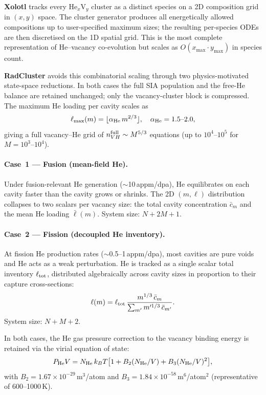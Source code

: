 \documentclass[12pt,letterpaper]{article}
\begin{document}
\textbf{Xolotl} tracks every He$_x$V$_y$ cluster as a distinct species
on a 2D composition grid in $(x,y)$ space.  The cluster generator
produces all energetically allowed compositions up to user-specified
maximum sizes; the resulting per-species ODEs are then discretised on the
1D spatial grid.  This is the most complete representation of
He--vacancy co-evolution but scales as $O(x_{\max}\cdot y_{\max})$
in species count.

\textbf{RadCluster} avoids this combinatorial scaling through two
physics-motivated state-space reductions.  In both cases the full SIA
population and the free-He balance are retained unchanged; only the
vacancy-cluster block is compressed.  The maximum He loading per cavity
scales as
\begin{equation}
  \ell_{\max}(m) = \lfloor \alpha_{\rm He}\,m^{2/3} \rfloor,
  \quad \alpha_{\rm He} = 1.5\text{--}2.0,
\end{equation}
giving a full vacancy--He grid of $n_{VH}^{\rm full}\sim M^{5/3}$
equations (up to $10^4$--$10^5$ for $M = 10^3$--$10^4$).

\paragraph{Case~1 --- Fusion (mean-field He).}
Under fusion-relevant He generation ($\sim$10\,appm/dpa), He
equilibrates on each cavity faster than the cavity grows or shrinks.
The 2D $(m,\ell)$ distribution collapses to two scalars per vacancy
size: the total cavity concentration $\bar{c}_m$ and the mean He loading
$\bar{\ell}(m)$.  System size: $N + 2M + 1$.

\paragraph{Case~2 --- Fission (decoupled He inventory).}
At fission He production rates ($\sim$0.5--1\,appm/dpa), most cavities
are pure voids and He acts as a weak perturbation.  He is tracked as a
single scalar total inventory $\ell_{\rm tot}$, distributed algebraically
across cavity sizes in proportion to their capture cross-sections:
\begin{equation}
  \ell(m) = \ell_{\rm tot}\,
    \frac{m^{1/3}\,\bar{c}_m}{\sum_{m'} m'^{1/3}\,\bar{c}_{m'}}.
\end{equation}
System size: $N + M + 2$.

In both cases, the He gas pressure correction to the vacancy binding
energy is retained via the virial equation of state:
\begin{equation}
  P_{\rm He}V = N_{\rm He}\,k_BT
  \bigl[1 + B_2(N_{\rm He}/V) + B_3(N_{\rm He}/V)^2\bigr],
\end{equation}
with $B_2 = 1.67\times10^{-29}$\,m$^3$/atom and
$B_3 = 1.84\times10^{-58}$\,m$^6$/atom$^2$ (representative of
600--1000\,K).
\end{document}
